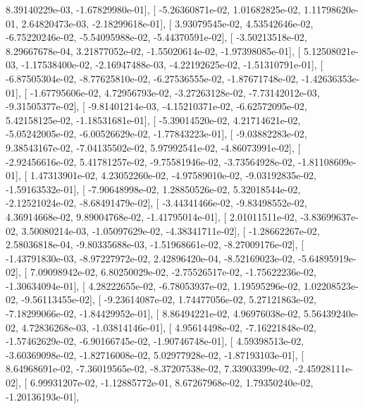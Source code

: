 \documentclass{article}
\begin{document}
          8.39140229e-03,  -1.67829980e-01],
       [ -5.26360871e-02,   1.01682825e-02,   1.11798620e-01,
          2.64820473e-03,  -2.18299618e-01],
       [  3.93079545e-02,   4.53542646e-02,  -6.75220246e-02,
         -5.54095988e-02,  -5.44370591e-02],
       [ -3.50213518e-02,   8.29667678e-04,   3.21877052e-02,
         -1.55020614e-02,  -1.97398085e-01],
       [  5.12508021e-03,  -1.17538400e-02,  -2.16947488e-03,
         -4.22192625e-02,  -1.51310791e-01],
       [ -6.87505304e-02,  -8.77625810e-02,  -6.27536555e-02,
         -1.87671748e-02,  -1.42636353e-01],
       [ -1.67795606e-02,   4.72956793e-02,  -3.27263128e-02,
         -7.73142012e-03,  -9.31505377e-02],
       [ -9.81401214e-03,  -4.15210371e-02,  -6.62572095e-02,
          5.42158125e-02,  -1.18531681e-01],
       [ -5.39014520e-02,   4.21714621e-02,  -5.05242005e-02,
         -6.00526629e-02,  -1.77843223e-01],
       [ -9.03882283e-02,   9.38543167e-02,  -7.04135502e-02,
          5.97992541e-02,  -4.86073991e-02],
       [ -2.92456616e-02,   5.41781257e-02,  -9.75581946e-02,
         -3.73564928e-02,  -1.81108609e-01],
       [  1.47313901e-02,   4.23052260e-02,  -4.97589010e-02,
         -9.03192835e-02,  -1.59163532e-01],
       [ -7.90648998e-02,   1.28850526e-02,   5.32018544e-02,
         -2.12521024e-02,  -8.68491479e-02],
       [ -3.44341466e-02,  -9.83498552e-02,   4.36914668e-02,
          9.89004768e-02,  -1.41795014e-01],
       [  2.01011511e-02,  -3.83699637e-02,   3.50080214e-03,
         -1.05097629e-02,  -4.38341711e-02],
       [ -1.28662267e-02,   2.58036818e-04,  -9.80335688e-03,
         -1.51968661e-02,  -8.27009176e-02],
       [ -1.43791830e-03,  -8.97227972e-02,   2.42896420e-04,
         -8.52169023e-02,  -5.64895919e-02],
       [  7.09098942e-02,   6.80250029e-02,  -2.75526517e-02,
         -1.75622236e-02,  -1.30634094e-01],
       [  4.28222655e-02,  -6.78053937e-02,   1.19595296e-02,
          1.02208523e-02,  -9.56113455e-02],
       [ -9.23614087e-02,   1.74477056e-02,   5.27121863e-02,
         -7.18299066e-02,  -1.84429952e-01],
       [  8.86494221e-02,   4.96976038e-02,   5.56439240e-02,
          4.72836268e-03,  -1.03814146e-01],
       [  4.95614498e-02,  -7.16221848e-02,  -1.57462629e-02,
         -6.90166745e-02,  -1.90746748e-01],
       [  4.59398513e-02,  -3.60369098e-02,  -1.82716008e-02,
          5.02977928e-02,  -1.87193103e-01],
       [  8.64968691e-02,  -7.36019565e-02,  -8.37207538e-02,
          7.33903399e-02,  -2.45928111e-02],
       [  6.99931207e-02,  -1.12885772e-01,   8.67267968e-02,
          1.79350240e-02,  -1.20136193e-01],
\end{document}
